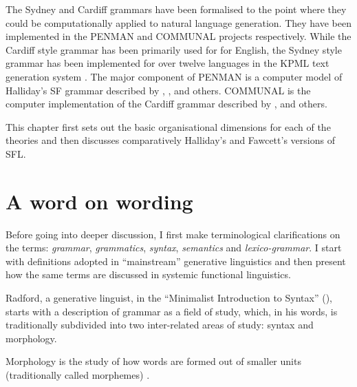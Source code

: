     The Sydney and Cardiff grammars have been formalised to the point where they could be computationally applied to natural language generation. They have been implemented in the PENMAN \citep{PenmanOverview,Penman89} and COMMUNAL \citep{Fawcett90-communal} projects respectively. While the Cardiff style grammar has been primarily used for for English, the Sydney style grammar has been implemented for over twelve languages in the KPML text generation system \citep{KPML1,Bateman96-KPML-resources,Bateman1997}. The major component of PENMAN is a computer model of Halliday's SF grammar described by \citet{gazebo}, \citet{MatthiessenBateman91}, \citet{Matthiessen95-all} and others. COMMUNAL is the computer implementation of the Cardiff grammar described by \citet{Fawcett:1988}, \citet{Fawcett93-ewnlg4} and others. 
    
    This chapter first sets out the basic organisational dimensions for each of the theories and then discusses comparatively Halliday's \citep{Halliday2002} and Fawcett's \citep{Fawcett2000} versions of SFL.


\section{A word on wording}
\label{sec:wording}
    Before going into deeper discussion, I first make terminological clarifications on the terms: \textit{grammar}, \textit{grammatics}, \textit{syntax}, \textit{semantics} and \textit{lexico-grammar}. I start with definitions adopted in ``mainstream'' generative linguistics and then present how the same terms are discussed in systemic functional linguistics.
    
    Radford, a generative linguist, in the ``Minimalist Introduction to Syntax'' (\citeyear{Radford1997}), starts with a description of grammar as a field of study, which, in his words, is traditionally subdivided into two inter-related areas of study: syntax and morphology. %
    
    \begin{definition}\label{def:morphology-min}
    Morphology is the study of how words are formed out of smaller units (traditionally called morphemes) \citep[1]{Radford1997}.
    \end{definition}
    

